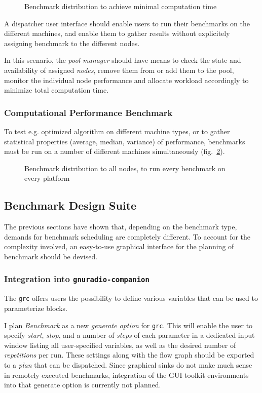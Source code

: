 \documentclass[a4paper]{IEEEtran}
\newcommand{\grc}{\texttt{grc}\xspace}
\begin{document}
\begin{figure}[h] \small\centering 
\caption{\label{fig:minimizetime}Benchmark distribution to achieve minimal
computation time} \end{figure}

A dispatcher user interface should enable users to run their benchmarks on the
different machines, and enable them to gather results without explicitely
assigning benchmark to the different nodes.

In this scenario, the \emph{pool manager} should have means to check the state
and availability of assigned \emph{nodes}, remove them from or add them to the
pool, monitor the individual node performance and allocate workload accordingly
to minimize total computation time.

\subsubsection*{Computational Performance Benchmark} To test e.g. optimized
algorithm on different machine types, or to gather statistical properties
(average, median, variance) of performance, benchmarks must be run on a number
of different machines simultaneously (fig.~\ref{fig:runonall}).

\begin{figure}[h] \small\centering 
\caption{\label{fig:runonall}Benchmark distribution to all nodes, to run every
benchmark on every platform} \end{figure}

\subsection{Benchmark Design Suite}

The previous sections have shown that, depending on the benchmark type, demands
for benchmark scheduling are completely different. To account for the complexity
involved, an easy-to-use graphical interface for the planning of benchmark should
be devised.

\subsubsection*{Integration into \texttt{gnuradio-companion}}

The \grc offers users the possibility to define various variables that
can be used to parameterize blocks.

I plan \emph{Benchmark} as a new \textit{generate option} for \grc.
This will enable the user to specify \textsl{start}, \textsl{stop}, and a number of
\textsl{steps} of each parameter in a dedicated input window listing all user-specified
variables, as well as the desired number of \textsl{repetitions} per run.
These settings along with the flow graph should be exported to a \emph{plan} that can be
dispatched. Since graphical sinks do not make much sense in remotely executed benchmarks,
integration of the GUI toolkit environments into that generate option is currently not 
planned.
\end{document}
